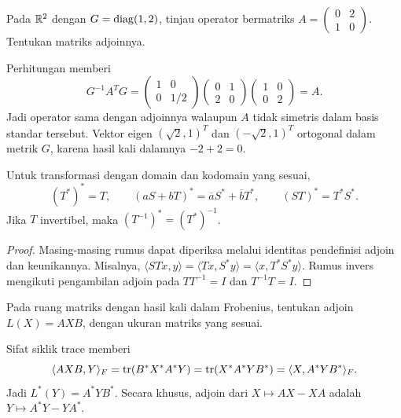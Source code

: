 \begin{exam}
    Pada $\mathbb{R}^2$ dengan $G=\operatorname{diag}(1,2)$, tinjau operator
    bermatriks $A=\begin{pmatrix}0&2\\1&0\end{pmatrix}$.
    Tentukan matriks adjoinnya.
\end{exam}
\begin{solution}
    Perhitungan memberi
    \[
        G^{-1}A^TG
        =\begin{pmatrix}1&0\\0&1/2\end{pmatrix}
         \begin{pmatrix}0&1\\2&0\end{pmatrix}
         \begin{pmatrix}1&0\\0&2\end{pmatrix}=A.
    \]
    Jadi operator sama dengan adjoinnya walaupun $A$ tidak
    simetris dalam basis standar tersebut.
    Vektor eigen $(\sqrt2,1)^T$ dan $(-\sqrt2,1)^T$
    ortogonal dalam metrik $G$, karena hasil kali dalamnya $-2+2=0$.
\end{solution}

\begin{prop}
    Untuk transformasi dengan domain dan kodomain yang sesuai,
    \[
        (T^*)^*=T,\qquad
        (aS+bT)^*=\overline aS^*+\overline bT^*,\qquad
        (ST)^*=T^*S^*.
    \]
    Jika $T$ invertibel, maka $(T^{-1})^*=(T^*)^{-1}$.
\end{prop}
\begin{proof}
    Masing-masing rumus dapat diperiksa melalui identitas
    pendefinisi adjoin dan keunikannya.
    Misalnya,
    $\langle STx,y\rangle=\langle Tx,S^*y\rangle
    =\langle x,T^*S^*y\rangle$.
    Rumus invers mengikuti pengambilan adjoin pada
    $TT^{-1}=I$ dan $T^{-1}T=I$.
\end{proof}

\begin{exam}
    Pada ruang matriks dengan hasil kali dalam Frobenius,
    tentukan adjoin $L(X)=AXB$, dengan ukuran matriks yang sesuai.
\end{exam}
\begin{solution}
    Sifat siklik trace memberi
    \[
        \langle AXB,Y\rangle_F
        =\operatorname{tr}(B^*X^*A^*Y)
        =\operatorname{tr}(X^*A^*YB^*)=\langle X,A^*YB^*\rangle_F.
    \]
    Jadi $L^*(Y)=A^*YB^*$.
    Secara khusus, adjoin dari $X\mapsto AX-XA$ adalah
    $Y\mapsto A^*Y-YA^*$.
\end{solution}

